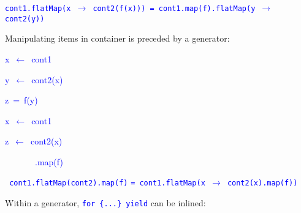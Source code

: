 \texttt{\textcolor{blue}{\footnotesize{}cont1.flatMap(x $\rightarrow$
cont2(f(x))) = cont1.map(f).flatMap(y $\rightarrow$ cont2(y))}} 

Manipulating items in container is preceded by a generator:

\texttt{\textcolor{blue}{\footnotesize{}}}%
\begin{minipage}[c][1\totalheight][t]{0.49\columnwidth}%
\begin{lyxcode}
\textcolor{blue}{\footnotesize{}x~$\leftarrow$~cont1}{\footnotesize\par}

\textcolor{blue}{\footnotesize{}y~$\leftarrow$~cont2(x)}{\footnotesize\par}

\textcolor{blue}{\footnotesize{}z~=~f(y)}{\footnotesize\par}
\end{lyxcode}
%
\end{minipage}\texttt{\textcolor{blue}{\footnotesize{}\hfill{}}}%
\begin{minipage}[c][1\totalheight][t]{0.49\columnwidth}%
\begin{lyxcode}
\textcolor{blue}{\footnotesize{}x~$\leftarrow$~cont1}{\footnotesize\par}

\textcolor{blue}{\footnotesize{}z~$\leftarrow$~cont2(x)}{\footnotesize\par}

\textcolor{blue}{\footnotesize{}~~~~~~~.map(f)}{\footnotesize\par}
\end{lyxcode}
%
\end{minipage}\texttt{\textcolor{blue}{\footnotesize{}\hfill{}\medskip{}
cont1.flatMap(cont2).map(f)}} \texttt{\textcolor{blue}{\footnotesize{}=
cont1.flatMap(x $\rightarrow$ cont2(x).map(f))}} 

Within a generator, \texttt{\textcolor{blue}{\footnotesize{}for \{...\}
yield}} can be inlined:


